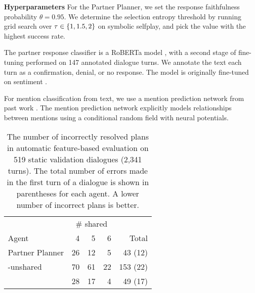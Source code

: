 \documentclass[11pt]{article}
\newcommand{\justin}[1]{{{\textcolor{purple}{(Justin: #1)}}}}
\begin{document}

\textbf{Hyperparameters}
For the Partner Planner, we set the response faithfulness probability $\theta = 0.95$.
We determine the selection entropy threshold by running grid search over $\tau \in \left\{1,1.5,2\right\}$ on symbolic selfplay, and pick the value with the highest success rate.

The partner response classifier is a RoBERTa model \citep{roberta}, with a second stage of fine-tuning performed on 147 annotated dialogue turns.
We annotate the text each turn as a confirmation, denial, or no response.
The model is originally fine-tuned on sentiment \citep{heitmann2020}.

For mention classification from text, we use a mention prediction network from past work \citep{fried}.
The mention prediction network explicitly models relationships between mentions using a conditional random field with neural potentials.

\begin{table}[!t]
\centering
\begin{tabular}{lrrrr}
\toprule
& \multicolumn{3}{c}{\# shared} &\\
\cmidrule{2-4}
Agent                   & 4  & 5  & 6  & Total\\
\midrule
Partner Planner         & 26 & 12 & 5  & 43  (12)\\
\quad -unshared         & 70 & 61 & 22 & 153 (22)\\
\citet{fried}           & 28 & 17 & 4  & 49  (17)\\
\bottomrule
\end{tabular}
\caption{\label{tbl:static-plans}
The number of incorrectly resolved plans in
automatic feature-based evaluation on 519 static validation dialogues
(2,341 turns).
The total number of errors made in the first turn of a dialogue is shown in parentheses for each agent.
A lower number of incorrect plans is better.
}
\end{table}
\end{document}
